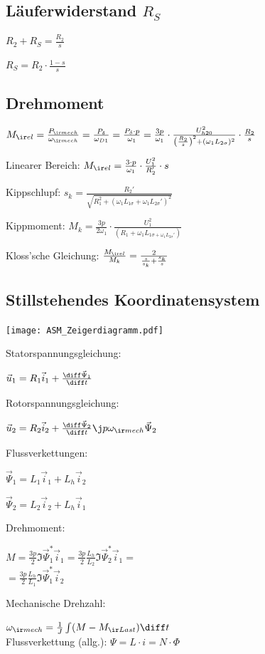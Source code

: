 \documentclass[german]{latex4ei_fs}
\begin{document}
\begin{sectionbox}
\subsection{Läuferwiderstand $R_S$}

$R_2 + R_S = \frac{R_2}{s}$

$R_S = R_2 \cdot \frac{1 - s}{s}$ 
\end{sectionbox}

\begin{sectionbox}
\subsection{Drehmoment}

$M_{\ir el} = \frac{P_{\ir mech}}{\omega_{\ir mech}} = \frac{P_\delta}{\omega_{D1}} = \frac{P_\delta \cdot p}{\omega_1} = \frac{3 p }{\omega_1} \cdot \frac{U_{h20}^2}{\left(\frac{R_2}{s}\right)^2 + (\omega_1 L_{2 \sigma})^2} \cdot \frac{R_2}{s}$

Linearer Bereich: $M_{\ir el} = \frac{3 \cdot p}{\omega_1} \cdot \frac{U_1^2}{R_2'} \cdot s$

Kippschlupf: $s_k = \frac{R_2'}{\sqrt{R_1^2 + (\omega_1 L_{1 \sigma} + \omega_1 L_{2 \sigma}')^2}}$

Kippmoment: $M_k = \frac{3p}{2 \omega_1} \cdot \frac{U_1^2}{(R_1 + \omega_1 L_{1 \sigma + \omega_1 L_{2 \sigma}'})}$

Kloss'sche Gleichung: $\frac{M_{\ir el}}{M_k} = \frac{2}{\frac{s}{s_k} + \frac{s_k}{s}}$
\end{sectionbox}

\begin{sectionbox}
\subsection{Stillstehendes Koordinatensystem}

\texttt{[image: ASM\_Zeigerdiagramm.pdf]}


Statorspannungsgleichung:

$\vec u_1 = R_1 \vec i_1 + \frac{\diff \vec \Psi_1}{\diff t}$ 

Rotorspannungsgleichung: 

$\vec u_2 = R_2 \vec i_2 + \frac{\diff \vec \Psi_2}{\diff t}  \j p \omega_{\ir mech} \vec \Psi_2$

Flussverkettungen: 

$\vec \Psi_1 = L_1 \vec i_1 + L_h \vec i_2$

$\vec \Psi_2  = L_2 \vec i_2 + L_h \vec i_1$


Drehmoment:

$M = \frac{3p}{2} \Im{\vec \Psi_1^* \vec i_1} = \frac{3p}{2} \frac{L_h}{L_2} \Im{\vec \Psi_2^* \vec i_1} = $ \\ $ = \frac{3p}{2} \frac{L_h}{L_1} \Im{\vec \Psi_1^* \vec i_2} $ 

Mechanische Drehzahl: 

$\omega_{\ir mech} = \frac{1}{J} \int (M - M_{\ir Last}) \diff t$ \\

Flussverkettung (allg.): $\Psi = L \cdot i = N \cdot \Phi$
\end{sectionbox}
\end{document}
